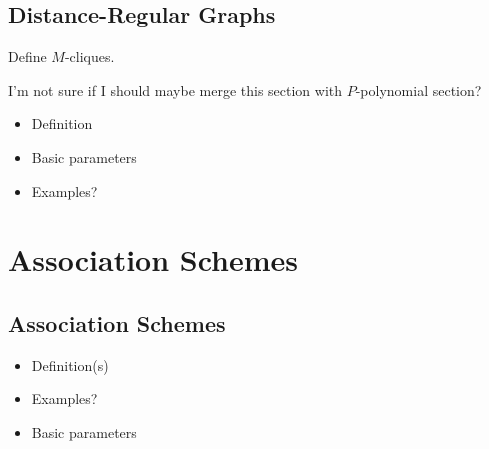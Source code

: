 \documentclass{report}
\begin{document}
  \section{Distance-Regular Graphs}
    Define $M$-cliques.

    I'm not sure if I should maybe merge this section with $P$-polynomial
    section?

    \begin{itemize}
      \item Definition
      \item Basic parameters
      \item Examples?
    \end{itemize}

\chapter{Association Schemes}
  \section{Association Schemes}\label{sec:AS:AS}
    \begin{itemize}
      \item Definition(s)
      \item Examples?
      \item Basic parameters
    \end{itemize}
\end{document}
